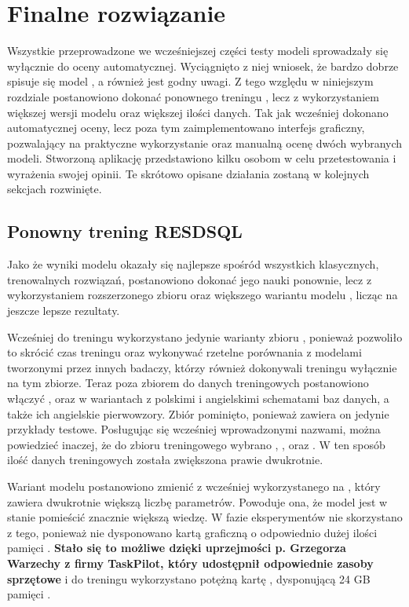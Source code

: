 \chapter{Finalne rozwiązanie}
Wszystkie przeprowadzone we wcześniejszej części testy modeli sprowadzały się wyłącznie do oceny automatycznej. Wyciągnięto z niej wniosek, że bardzo dobrze spisuje się model , a  również jest godny uwagi. Z tego względu w niniejszym rozdziale postanowiono dokonać ponownego treningu , lecz z wykorzystaniem większej wersji modelu  oraz większej ilości danych. Tak jak wcześniej dokonano automatycznej oceny, lecz poza tym zaimplementowano interfejs graficzny, pozwalający na praktyczne wykorzystanie oraz manualną ocenę dwóch wybranych modeli. Stworzoną aplikację przedstawiono kilku osobom w celu przetestowania i wyrażenia swojej opinii. Te skrótowo opisane działania zostaną w kolejnych sekcjach rozwinięte.

\section{Ponowny trening RESDSQL}
Jako że wyniki modelu  okazały się najlepsze spośród wszystkich klasycznych, trenowalnych rozwiązań, postanowiono dokonać jego nauki ponownie, lecz z wykorzystaniem rozszerzonego zbioru oraz większego wariantu modelu , licząc na jeszcze lepsze rezultaty.

Wcześniej do treningu wykorzystano jedynie warianty zbioru , ponieważ pozwoliło to skrócić czas treningu oraz wykonywać rzetelne porównania z modelami tworzonymi przez innych badaczy, którzy również dokonywali treningu wyłącznie na tym zbiorze. Teraz poza zbiorem  do danych treningowych postanowiono włączyć ,  oraz  w wariantach z polskimi i angielskimi schematami baz danych, a także ich angielskie pierwowzory. Zbiór  pominięto, ponieważ zawiera on jedynie przykłady testowe. Posługując się wcześniej wprowadzonymi nazwami, można powiedzieć inaczej, że do zbioru treningowego wybrano , ,  oraz . W ten sposób ilość danych treningowych została zwiększona prawie dwukrotnie.

Wariant modelu  postanowiono zmienić z wcześniej wykorzystanego  na , który zawiera dwukrotnie większą liczbę parametrów. Powoduje ona, że model jest w stanie pomieścić znacznie większą wiedzę. W fazie eksperymentów nie skorzystano z tego, ponieważ nie dysponowano kartą graficzną o odpowiednio dużej ilości pamięci . \textbf{Stało się to możliwe dzięki uprzejmości p. Grzegorza Warzechy z firmy TaskPilot, który udostępnił odpowiednie zasoby sprzętowe} i do treningu wykorzystano potężną kartę , dysponującą 24 GB pamięci .

